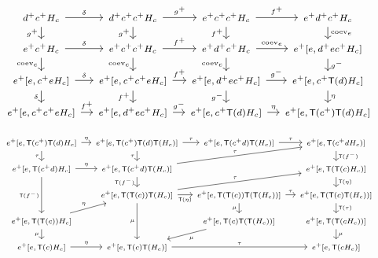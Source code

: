 \documentclass[11pt]{article}
\theoremstyle{definition}
\newcommand{\outp}[1]{#1^{+}}
\newcommand{\inpt}[1]{#1^{-}}
\newcommand{\Fun}[1]{\textsf{#1}}
\newcommand{\coev}{\mathrm{coev}}
\begin{document}
\begin{landscape}
\noindent\begin{minipage}{0.48\linewidth}
\[
\resizebox{\linewidth}{!}{%
\begin{tikzcd}[column sep=1em, row sep=1em, every label/.append style={font=\tiny}, font=\scriptsize, ampersand replacement=\&]
\outp d\outp c H_c
  \ar[r, "{\delta}"]
  \ar[d, "{\outp g}"']
\& \outp d\outp c\outp c H_c \ar[r, "{\outp g}"] \ar[d, "{\outp g}"']
\& \outp e\outp c\outp c H_c \ar[r, "{\outp f}"] \ar[d, "{\outp f}"']
\& \outp e\outp d\outp c H_c \ar[d, "{\coev_e}"] \\
\outp e\outp c H_c \ar[r, "{\delta}"] \ar[d, "{\coev_e}"']
\& \outp e\outp c\outp c H_c \ar[r, "{\outp f}"] \ar[d, "{\coev_e}"']
\& \outp e\outp d\outp c H_c \ar[r, "{\coev_e}"] \ar[d, "{\coev_e}"']
\& \outp e[e,\outp d e\outp c H_c] \ar[d, "{\inpt g}"] \\
\outp e[e,\outp c e H_c] \ar[r, "{\delta}"] \ar[d, "{\delta}"']
\& \outp e[e,\outp c\outp c e H_c] \ar[r, "{\outp f}"] \ar[d, "{\outp f}"']
\& \outp e[e,\outp d e\outp c H_c] \ar[r, "{\inpt g}"] \ar[d, "{\inpt g}"']
\& \outp e[e,\outp c\Fun T(d)H_c] \ar[d, "{\eta}"] \\
\outp e[e,\outp c\outp c e H_c] \ar[r, "{\outp f}"]
\& \outp e[e,\outp d e\outp c H_c] \ar[r, "{\inpt g}"]
\& \outp e[e,\outp c\Fun T(d)H_c] \ar[r, "{\eta}"]
\& \outp e[e,\Fun T(\outp c)\Fun T(d)H_c]
\end{tikzcd}
}
\]
\end{minipage}\hfill
\begin{minipage}{0.5\linewidth}
\[
\resizebox{\linewidth}{!}{%
\begin{tikzcd}[column sep=1em, row sep=1em, every label/.append style={font=\tiny}, font=\scriptsize, ampersand replacement=\&]
\outp e[e,\Fun T(\outp c)\Fun T(d)H_c]
  \ar[r, "{\eta}"]
  \ar[d, "{\tau}"']
\& \outp e[e,\Fun T(\outp c)\Fun T(d)\Fun T(H_c)] \ar[r, "{\tau}"] \ar[d, "{\tau}"']
\& \outp e[e,\Fun T(\outp c d)\Fun T(H_c)] \ar[r, "{\tau}"]
\& \outp e[e,\Fun T(\outp c d H_c)] \ar[d, "{\Fun T(\inpt f)}"] \\
\outp e[e,\Fun T(\outp c d)H_c] \ar[r, "{\eta}"] \ar[dd, "{\Fun T(\inpt f)}"']
\& \outp e[e,\Fun T(\outp c d)\Fun T(H_c)] \ar[urr, "{\tau}"] \ar[d, "{\Fun T(\inpt f)}"']
\&\& \outp e[e,\Fun T(\Fun T(c)H_c)] \ar[d, "{\Fun T(\eta)}"] \\
\& \outp e[e,\Fun T(\Fun T(c))\Fun T(H_c)] \ar[urr, "{\tau}"] \ar[dd, "{\mu}"'] \ar[r, "{\Fun T(\eta)}"']
\& \outp e[e,\Fun T(\Fun T(c))\Fun T(\Fun T(H_c))] \ar[r, "{\tau}"] \ar[d, "{\mu}"']
\& \outp e[e,\Fun T(\Fun T(c)\Fun T(H_c))] \ar[d, "{\Fun T(\tau)}"] \\
\outp e[e,\Fun T(\Fun T(c))H_c] \ar[ur, "{\eta}"] \ar[d, "{\mu}"']
\&\& \outp e[e,\Fun T(c)\Fun T(\Fun T(H_c))] \ar[dl, "{\mu}"]
\& \outp e[e,\Fun T(\Fun T(cH_c))] \ar[d, "{\mu}"] \\
\outp e[e,\Fun T(c)H_c] \ar[r, "{\eta}"]
\& \outp e[e,\Fun T(c)\Fun T(H_c)] \ar[rr, "{\tau}"]
\&\& \outp e[e,\Fun T(cH_c)]
\end{tikzcd}
}
\]
\end{minipage}
\end{landscape}
\end{document}
